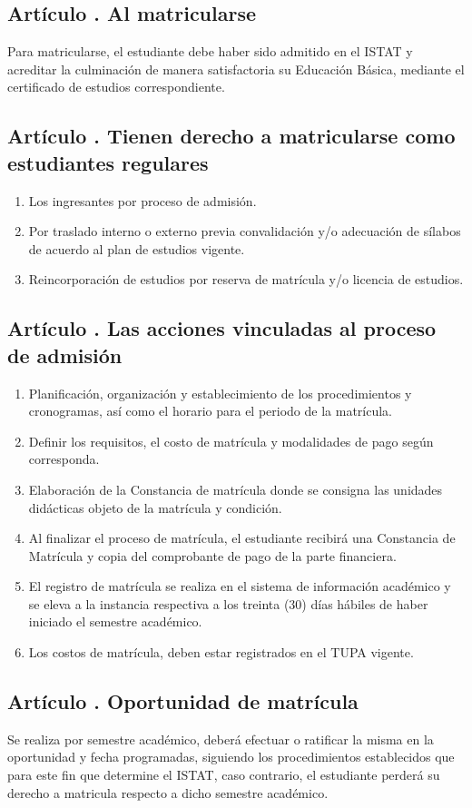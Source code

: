 \subsection{Artículo . Al matricularse}
\addtocounter{ns}{1}
Para matricularse, el estudiante debe haber sido admitido en el ISTAT y acreditar la culminación de manera satisfactoria su Educación Básica, mediante el certificado de estudios correspondiente.
\subsection{Artículo . Tienen derecho a matricularse como estudiantes regulares}
\addtocounter{ns}{1}
\begin{enumerate}
\item Los ingresantes por proceso de admisión. 
\item Por traslado interno o externo previa convalidación y/o adecuación de sílabos de acuerdo al plan de estudios vigente. 
\item Reincorporación de estudios por reserva de matrícula y/o licencia de estudios.
\end{enumerate}
\subsection{Artículo . Las acciones vinculadas al proceso de admisión}
\addtocounter{ns}{1}
\begin{enumerate}
\item Planificación, organización y establecimiento de los procedimientos y cronogramas, así como el horario para el periodo de la matrícula. 
\item Definir los requisitos, el costo de matrícula y modalidades de pago según corresponda. 
\item Elaboración de la Constancia de matrícula donde se consigna las unidades didácticas objeto de la matrícula y condición.
\item Al finalizar el proceso de matrícula, el estudiante recibirá una Constancia de Matrícula y copia del comprobante de pago de la parte financiera.
\item El registro de matrícula se realiza en el sistema de información académico y se eleva a la instancia respectiva a los treinta (30) días hábiles de haber iniciado el semestre académico.   
\item Los costos de matrícula, deben estar registrados en el TUPA vigente.
\end{enumerate}
\subsection{Artículo . Oportunidad de matrícula}
\addtocounter{ns}{1}
Se realiza por semestre académico, deberá efectuar o ratificar la misma en la oportunidad y fecha programadas, siguiendo los procedimientos establecidos que para este fin que determine el ISTAT, caso contrario, el estudiante perderá su derecho a matricula respecto a dicho semestre académico. 
